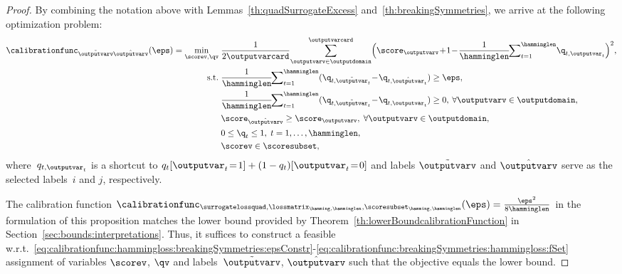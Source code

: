 \documentclass{article}
\begin{document}
\begin{proof}
    By combining the notation above with Lemmas~\ref{th:quadSurrogateExcess} and~\ref{th:breakingSymmetries}, we arrive at the following optimization problem:
    \begin{align}
    \label{eq:calibrationfunc:hammingloss:breakingSymmetries}
    \calibrationfunc_{\tilde{\outputvarv}\hat{\outputvarv}}(\eps)
    =
    \min_{\scorev, \qv} \;& \frac{1}{2 \outputvarcard}\! \sum_{\outputvarv \in \outputdomain}^{\outputvarcard} \Bigl( \score_\outputvarv \!+\! 1 \!-\! \frac{1}{\hamminglen} \!\!\sum\nolimits_{t=1}^\hamminglen \!\q_{t, \outputvar_t}\Bigr)^2, \\
    \label{eq:calibrationfunc:hammingloss:breakingSymmetries:epsConstr}
    \text{s.t.} \;& \frac{1}{\hamminglen}\!\!\sum\nolimits_{t=1}^{\hamminglen} (\q_{t, \tilde{\outputvar}_t} \!-\! \q_{t, \hat{\outputvar}_t}) \geq \eps,\\
    \label{eq:calibrationfunc:hammingloss:breakingSymmetries:qConstr}
    & \frac{1}{\hamminglen}\!\!\sum\nolimits_{t=1}^{\hamminglen} (\q_{t, \tilde{\outputvar}_t} \!-\! \q_{t, \outputvar_t}) \geq 0,\: \forall \outputvarv \in \outputdomain, \\
    \label{eq:calibrationfunc:hammingloss:breakingSymmetries:fConstr}
    &\score_{\hat{\outputvarv}} \geq \score_\outputvarv,\; \forall \outputvarv \in \outputdomain, \\
    \label{eq:calibrationfunc:hammingloss:breakingSymmetries:simplexConstr}
    & 0\leq \q_t \leq 1, \; t = 1,\dots, \hamminglen,\\
    \label{eq:calibrationfunc:breakingSymmetries:hammingloss:fSet}
    & \scorev \in \scoresubset,
    \end{align}
    where~$q_{t, \outputvar_t}$ is a shortcut to $q_{t}[\outputvar_t\!=\!1] + (1-q_{t})[\outputvar_t\!=\!0]$ and labels $\tilde{\outputvarv}$ and $\hat{\outputvarv}$ serve as the selected labels~$i$ and $j$, respectively.
    
    The calibration function $\calibrationfunc_{\surrogatelossquad,\lossmatrix_{\hamming,\hamminglen},\scoresubset_{\hamming,\hamminglen}}(\eps)=
    \frac{\eps^2}{8\hamminglen}$ in the formulation of this proposition matches the lower bound provided by Theorem~\ref{th:lowerBoundcalibrationFunction} in Section~\ref{sec:bounds:interpretations}.
    Thus, it suffices to construct a feasible w.r.t.~\eqref{eq:calibrationfunc:hammingloss:breakingSymmetries:epsConstr}-\eqref{eq:calibrationfunc:breakingSymmetries:hammingloss:fSet} assignment of variables $\scorev$, $\qv$ and labels~$\tilde{\outputvarv}$, $\hat{\outputvarv}$ such that the objective equals the lower bound.
    

\end{proof}
\end{document}
